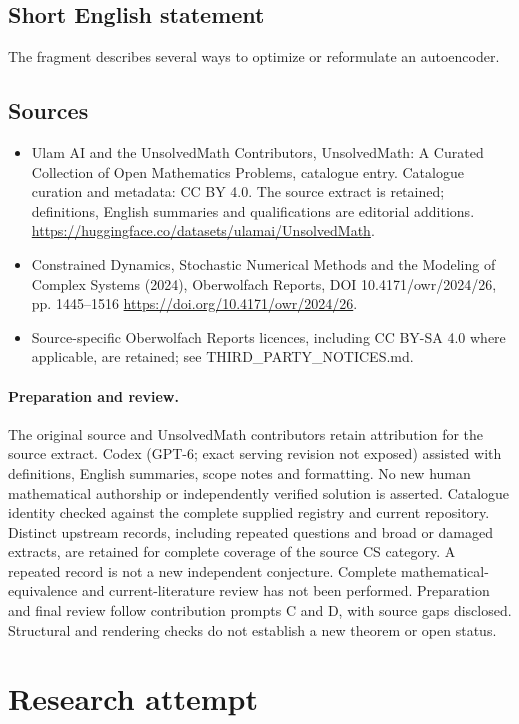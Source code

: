 \documentclass[11pt]{article}
\begin{document}
\subsection{Short English statement}
The fragment describes several ways to optimize or reformulate an autoencoder.
\subsection{Sources}
\begin{itemize}
\item[S1] Ulam AI and the UnsolvedMath Contributors, UnsolvedMath: A Curated Collection of Open Mathematics Problems, catalogue entry. Catalogue curation and metadata: CC BY 4.0. The source extract is retained; definitions, English summaries and qualifications are editorial additions.
\url{https://huggingface.co/datasets/ulamai/UnsolvedMath}.
\item[S2] Constrained Dynamics, Stochastic Numerical Methods and the Modeling of Complex Systems (2024), Oberwolfach Reports, DOI 10.4171/owr/2024/26, pp. 1445--1516
\url{https://doi.org/10.4171/owr/2024/26}.
\item Source-specific Oberwolfach Reports licences, including CC BY-SA 4.0 where applicable, are retained; see THIRD\_PARTY\_NOTICES.md.
\end{itemize}
\paragraph{Preparation and review.}
The original source and UnsolvedMath contributors retain attribution for the source extract. Codex (GPT-6; exact serving revision not exposed) assisted with definitions, English summaries, scope notes and formatting. No new human mathematical authorship or independently verified solution is asserted. Catalogue identity checked against the complete supplied registry and current repository. Distinct upstream records, including repeated questions and broad or damaged extracts, are retained for complete coverage of the source CS category. A repeated record is not a new independent conjecture. Complete mathematical-equivalence and current-literature review has not been performed. Preparation and final review follow contribution prompts C and D, with source gaps disclosed. Structural and rendering checks do not establish a new theorem or open status.
\label{end:statement}

\section{Research attempt}
\end{document}
